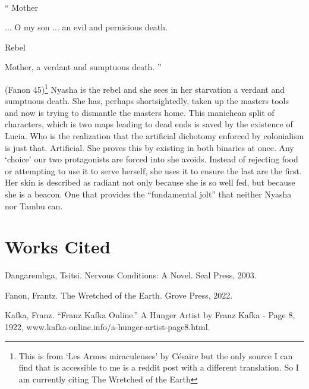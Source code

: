 \documentclass{article}
\begin{document}
\paragraph{}
\begin{center}
``
   Mother 

   ... O my son ... an evil and pernicious death.

   Rebel

   Mother, a verdant and sumptuous death.
'' 
\end{center} (Fanon 45)\footnote{ This is from `Les Armes miraculeuses' by Césaire but the only source I can find that is accessible to me is a reddit post with a different translation. So I am currently citing The Wretched of the Earth}
Nyasha is the rebel and she sees in her starvation a verdant and sumptuous death. She has, perhaps shortsightedly, taken up the masters tools and now is trying to dismantle the masters home. This manichean split of characters, which is two maps leading to dead ends is saved by the existence of Lucia. Who is the realization that the artificial dichotomy enforced by colonialism is just that. Artificial. She proves this by existing in both binaries at once. Any `choice' our two protagonists are forced into she avoids. Instead of rejecting food or attempting to use it to serve herself, she uses it to ensure the last are the first. Her skin is described as radiant not only because she is so well fed, but because she is a beacon. One that provides the ``fundamental jolt'' that neither Nyasha nor Tambu can.

\pagebreak
\section*{Works Cited}
    \noindent
    Dangarembga, Tsitsi. Nervous Conditions: A Novel. Seal Press, 2003. 

    \noindent
    Fanon, Frantz. The Wretched of the Earth. Grove Press, 2022. 

    \noindent
    Kafka, Franz. “Franz Kafka Online.” A Hunger Artist by Franz Kafka - Page 8, 1922, www.kafka-online.info/a-hunger-artist-page8.html. 
\end{document}
